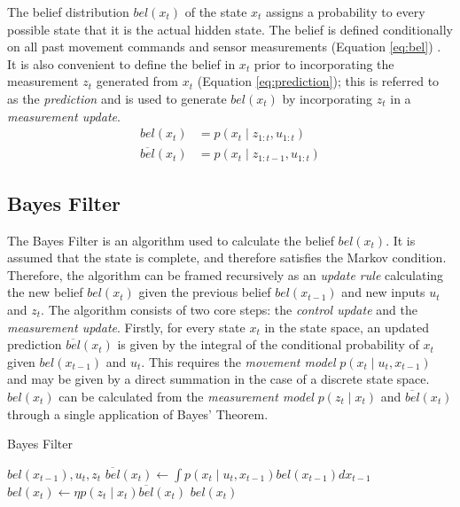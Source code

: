 \documentclass[english]{article}
\begin{document}
The belief distribution $bel(x_t)$ of the state $x_t$ assigns a probability to every possible state that it is the actual hidden state. The belief is defined conditionally on all past movement commands and sensor measurements (Equation \ref{eq:bel}) \cite{probrob}. It is also convenient to define the belief in $x_t$ prior to incorporating the measurement $z_t$ generated from $x_t$ (Equation \ref{eq:prediction}); this is referred to as the \emph{prediction} and is used to generate $bel(x_t)$ by incorporating $z_t$ in a \emph{measurement update}.
\begin {align}
  bel(x_t) & = p(x_t \mid z_{1:t},u_{1:t}) \label{eq:bel} \\   
  \overline{bel}(x_t) & = p(x_t \mid z_{1:t-1}, u_{1:t}) \label{eq:prediction}
\end {align}

\subsection{Bayes Filter}


The Bayes Filter is an algorithm used to calculate the belief $bel(x_t)$. It is assumed that the state is complete, and therefore satisfies the Markov condition. Therefore, the algorithm can be framed recursively as an \emph{update rule} calculating the new belief $bel({x_t})$ given the previous belief $bel(x_{t-1})$ and new inputs $u_t$ and $z_t$. The algorithm consists of two core steps: the \emph{control update} and the \emph{measurement update}. Firstly, for every state $x_t$ in the state space, an updated prediction $\overline{bel}(x_t)$ is given by the integral of the conditional probability of $x_t$ given $bel(x_{t-1})$ and $u_t$\cite{probrob}. This requires the \emph{movement model} $p(x_t \mid u_t,x_{t-1})$ and may be given by a direct summation in the case of a discrete state space. $bel(x_t)$ can be calculated from the \emph{measurement model} $p(z_t \mid x_t)$ and $\overline{bel}(x_t)$ through a single application of Bayes' Theorem.

\begin{algorithm}[H]
\caption{Bayes Filter}
\label{alg:bayes}
\begin{algorithmic}
	\REQUIRE $bel(x_{t-1}), u_t, z_t$
        \STATE $\overline{bel}(x_t) \leftarrow \int p(x_t \mid u_t, x_{t-1})bel(x_{t-1}) dx_{t-1}$
        \STATE $bel(x_t) \leftarrow \eta p(z_t \mid x_t) \overline{bel}(x_t)$
        \ENDFOR
        \RETURN $bel(x_t)$
\end{algorithmic}
\end{algorithm}
\end{document}
